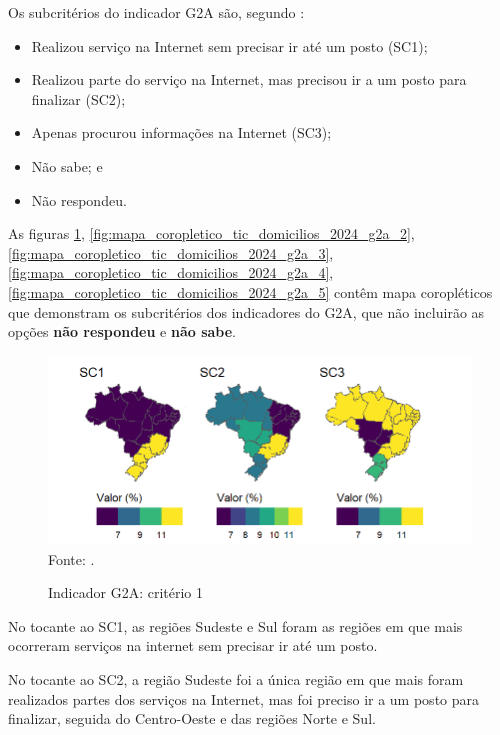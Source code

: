 Os subcritérios do indicador G2A são, segundo \cite{tic_domicilios_2024_g2a}:

\begin{itemize}
    \item Realizou serviço na Internet sem precisar ir até um posto (SC1);  \item Realizou parte do serviço na Internet, mas precisou ir a um posto para finalizar (SC2);
    \item Apenas procurou informações na Internet (SC3);
    \item Não sabe; e
    \item Não respondeu.
\end{itemize}

As figuras \ref{fig:mapa_coropletico_tic_domicilios_2024_g2a_1}, \ref{fig:mapa_coropletico_tic_domicilios_2024_g2a_2}, \ref{fig:mapa_coropletico_tic_domicilios_2024_g2a_3},
\ref{fig:mapa_coropletico_tic_domicilios_2024_g2a_4},
\ref{fig:mapa_coropletico_tic_domicilios_2024_g2a_5} contêm mapa coropléticos que demonstram os subcritérios dos indicadores do G2A, que não incluirão as opções \textbf{não respondeu} e \textbf{não sabe}.

\begin{figure}[H]
	\centering
	\caption{Indicador G2A: critério 1}
	\includegraphics[width=1\linewidth]{figuras/mapa_coropletico_tic_domicilios_2024_g2a_1.png}
	\label{fig:mapa_coropletico_tic_domicilios_2024_g2a_1}
	\footnotesize{Fonte: \cite{tic_domicilios_2024_g2a}.}
\end{figure}

No tocante ao SC1, as regiões Sudeste e Sul foram as regiões em que mais ocorreram serviços na internet sem precisar ir até um posto. 

No tocante ao SC2, a região Sudeste foi a única região em que mais foram realizados partes dos serviços na Internet, mas foi preciso ir a um posto para finalizar, seguida do Centro-Oeste e das regiões Norte e Sul.

